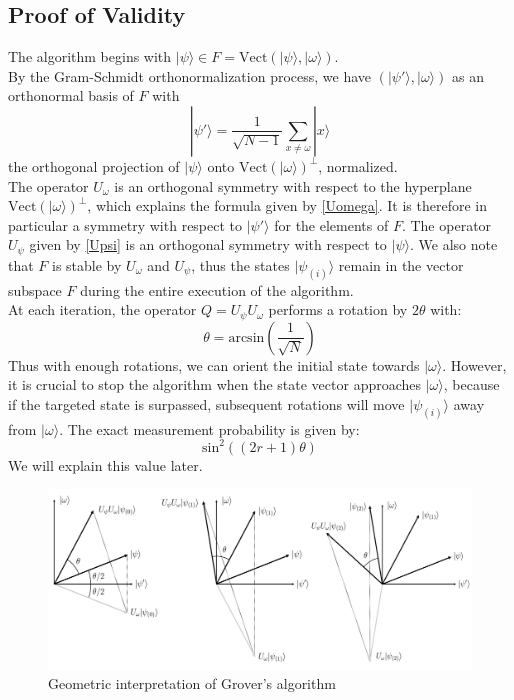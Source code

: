 
\subsection{Proof of Validity}

The algorithm begins with $|\psi \rangle \in F = \mathrm{Vect}(|\psi \rangle , |\omega \rangle )$. 
\\
By the Gram-Schmidt orthonormalization process, we have $(|\psi' \rangle, | \omega \rangle)$ as an orthonormal basis of $F$ with 
\[|\psi'\rangle = \frac{1}{\sqrt{N-1}}\sum_{x \neq \omega} |x \rangle\]
the orthogonal projection of $|\psi \rangle$ onto $\mathrm{Vect}(|\omega \rangle )^{\perp}$, normalized. 
\\
The operator $U_{\omega}$ is an orthogonal symmetry with respect to the hyperplane $\mathrm{Vect}(|\omega \rangle)^{\perp}$, which explains the formula given by \eqref{Uomega}. It is therefore in particular a symmetry with respect to $|\psi'\rangle$ for the elements of $F$.
The operator $U_{\psi}$ given by \eqref{Upsi} is an orthogonal symmetry with respect to $|\psi\rangle$.
We also note that $F$ is stable by $U_{\omega}$ and $U_{\psi}$, thus the states $|\psi_{(i)} \rangle$ remain in the vector subspace $F$ during the entire execution of the algorithm.
\\
At each iteration, the operator $Q=U_{\psi} U_{\omega}$ performs a rotation by $2\theta$ with:
\[\theta = \mathrm{arcsin}(\frac{1}{\sqrt{N}})\]
Thus with enough rotations, we can orient the initial state towards $|\omega \rangle$.
However, it is crucial to stop the algorithm when the state vector approaches $|\omega \rangle$, because if the targeted state is surpassed, subsequent rotations will move $|\psi_{(i)} \rangle$ away from $|\omega \rangle$.
The exact measurement probability is given by:
\[\mathrm{sin}^2 \left( \left( 2r + 1 \right) \theta \right) \]
We will explain this value later. 
\begin{figure}
\hspace{1.2cm}
\begin{adjustbox}{minipage=1.2\textwidth, right}
\includegraphics[scale=0.3]{GroverGeom.png}
\end{adjustbox}
\caption{Geometric interpretation of Grover's algorithm}
\label{fig:grover}
\end{figure}
